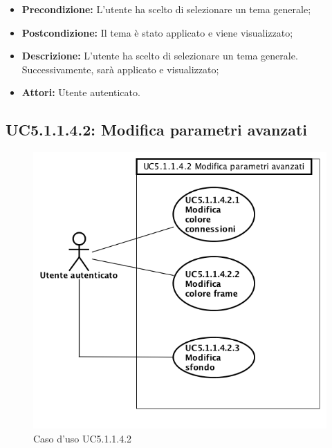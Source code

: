 \begin{itemize}
	\item \textbf{Precondizione:} L'utente ha scelto di selezionare un tema generale;
	\item \textbf{Postcondizione:} Il tema è stato applicato e viene visualizzato;
	\item \textbf{Descrizione:} L'utente ha scelto di selezionare un tema generale. Successivamente, sarà applicato e visualizzato;
	\item \textbf{Attori:} Utente autenticato.
\end{itemize}
\subsection{ UC5.1.1.4.2: Modifica parametri avanzati}

\begin{figure}[h]
	\begin{center}
	\includegraphics[scale=0.4]{diagram/UC5-1-1-4-2.png}
	\caption{Caso d'uso UC5.1.1.4.2}
	\end{center}
\end{figure}
